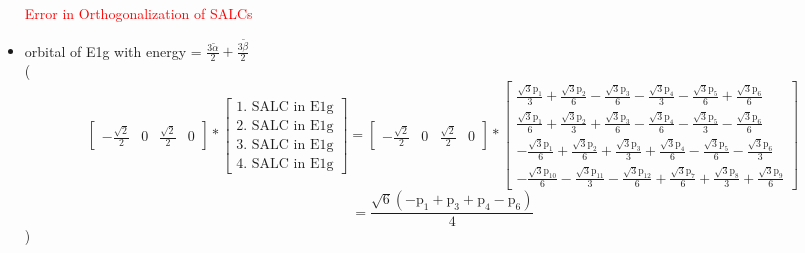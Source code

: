 \documentclass[12pt,a4paper]{article}
\begin{document}
\begin{itemize}
\textcolor{red}{Error in Orthogonalization of SALCs}\item orbital of E1g with energy = 
                                $\frac{3 \tilde{\alpha}}{2} + \frac{3 \tilde{\beta}}{2}$ \\
( 
$$
\left[\begin{matrix}- \frac{\sqrt{2}}{2} & 0 & \frac{\sqrt{2}}{2} & 0\end{matrix}\right] * \left[\begin{array}{c}\text{1. SALC in E1g} \\ \text{2. SALC in E1g} \\ \text{3. SALC in E1g} \\ \text{4. SALC in E1g}\end{array}\right] = \left[\begin{matrix}- \frac{\sqrt{2}}{2} & 0 & \frac{\sqrt{2}}{2} & 0\end{matrix}\right] * \left[\begin{matrix}\frac{\sqrt{3} \text{p}_{1}}{3} + \frac{\sqrt{3} \text{p}_{2}}{6} - \frac{\sqrt{3} \text{p}_{3}}{6} - \frac{\sqrt{3} \text{p}_{4}}{3} - \frac{\sqrt{3} \text{p}_{5}}{6} + \frac{\sqrt{3} \text{p}_{6}}{6}\\\frac{\sqrt{3} \text{p}_{1}}{6} + \frac{\sqrt{3} \text{p}_{2}}{3} + \frac{\sqrt{3} \text{p}_{3}}{6} - \frac{\sqrt{3} \text{p}_{4}}{6} - \frac{\sqrt{3} \text{p}_{5}}{3} - \frac{\sqrt{3} \text{p}_{6}}{6}\\- \frac{\sqrt{3} \text{p}_{1}}{6} + \frac{\sqrt{3} \text{p}_{2}}{6} + \frac{\sqrt{3} \text{p}_{3}}{3} + \frac{\sqrt{3} \text{p}_{4}}{6} - \frac{\sqrt{3} \text{p}_{5}}{6} - \frac{\sqrt{3} \text{p}_{6}}{3}\\- \frac{\sqrt{3} \text{p}_{10}}{6} - \frac{\sqrt{3} \text{p}_{11}}{3} - \frac{\sqrt{3} \text{p}_{12}}{6} + \frac{\sqrt{3} \text{p}_{7}}{6} + \frac{\sqrt{3} \text{p}_{8}}{3} + \frac{\sqrt{3} \text{p}_{9}}{6}\end{matrix}\right] 
 $$ $$ = \frac{\sqrt{6} \left(- \text{p}_{1} + \text{p}_{3} + \text{p}_{4} - \text{p}_{6}\right)}{4} 
 $$ 
 )


\end{itemize}
\end{document}
